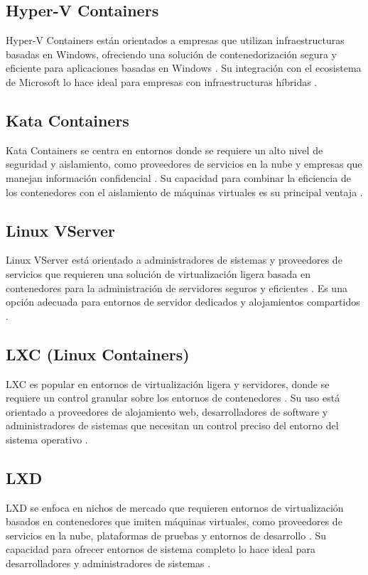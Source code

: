 \subsection{Hyper-V Containers}
\noindent
Hyper-V Containers están orientados a empresas que utilizan infraestructuras basadas en Windows, ofreciendo una solución de contenedorización segura y eficiente para aplicaciones basadas en Windows \citep{Smith2016}. Su integración con el ecosistema de Microsoft lo hace ideal para empresas con infraestructuras híbridas \citep{Clark2024}.

\subsection{Kata Containers}
\noindent
Kata Containers se centra en entornos donde se requiere un alto nivel de seguridad y aislamiento, como proveedores de servicios en la nube y empresas que manejan información confidencial \citep{Viktorsson2020}. Su capacidad para combinar la eficiencia de los contenedores con el aislamiento de máquinas virtuales es su principal ventaja \citep{10.1145/1272996.1273025}.

\subsection{Linux VServer}
\noindent
Linux VServer está orientado a administradores de sistemas y proveedores de servicios que requieren una solución de virtualización ligera basada en contenedores para la administración de servidores seguros y eficientes \citep{10.1145/1272996.1273025}. Es una opción adecuada para entornos de servidor dedicados y alojamientos compartidos \citep{LinuxVirt2017}.

\subsection{LXC (Linux Containers)}
\noindent
LXC es popular en entornos de virtualización ligera y servidores, donde se requiere un control granular sobre los entornos de contenedores \citep{Silva2024}. Su uso está orientado a proveedores de alojamiento web, desarrolladores de software y administradores de sistemas que necesitan un control preciso del entorno del sistema operativo \citep{Simon2023}.

\subsection{LXD}
\noindent
LXD se enfoca en nichos de mercado que requieren entornos de virtualización basados en contenedores que imiten máquinas virtuales, como proveedores de servicios en la nube, plataformas de pruebas y entornos de desarrollo \citep{Silva2024}. Su capacidad para ofrecer entornos de sistema completo lo hace ideal para desarrolladores y administradores de sistemas \citep{Kaiser2022}.

